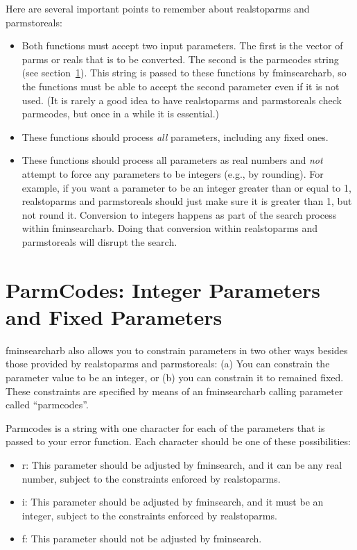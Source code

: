 \documentclass{article}
\begin{document}
Here are several important points to remember about realstoparms and parmstoreals:
\begin{itemize}
\item Both functions must accept two input parameters.  The first is the vector of parms
      or reals that is to be converted.
      The second is the parmcodes string (see section~\ref{sec:parmcodes}).
      This string is passed to these functions by fminsearcharb, so the functions must
      be able to accept the second parameter even if it is not used.
      (It is rarely a good idea to have realstoparms and parmstoreals
      check parmcodes, but once in a while it is essential.)
\item These functions should process \emph{all} parameters, including any fixed ones.
\item These functions should process all parameters as real numbers and \emph{not}
      attempt to force any parameters to be integers (e.g., by rounding).
      For example, if you want a parameter to be an integer greater than or equal to 1,
      realstoparms and parmstoreals should just make sure it is greater than 1,
      but not round it.
      Conversion to integers happens as part of the search process within fminsearcharb.
      Doing that conversion within realstoparms and parmstoreals will disrupt the search.
\end{itemize}


\section{ParmCodes: Integer Parameters and Fixed Parameters}
\label{sec:parmcodes}

fminsearcharb also allows you to constrain parameters in two other ways
besides those provided by realstoparms and parmstoreals:
(a) You can constrain the parameter value to be an integer, or
(b) you can constrain it to remained fixed.
These constraints are specified by means of an fminsearcharb calling
parameter called ``parmcodes''.

Parmcodes is a string with one character for each of the parameters
that is passed to your error function.
Each character should be one of these possibilities:
\begin{itemize}
\item r: This parameter should be adjusted by fminsearch, and it can be any real number, subject to the constraints
         enforced by realstoparms.
\item i: This parameter should be adjusted by fminsearch, and it must be an integer, subject to the constraints
         enforced by realstoparms.
\item f: This parameter should not be adjusted by fminsearch.
\end{itemize}
\end{document}
